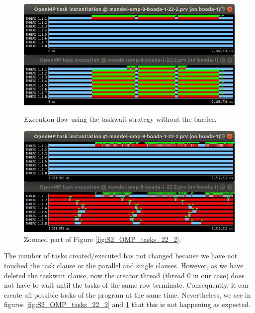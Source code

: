 \documentclass[12pt, a4paper]{article}
\begin{document}
\begin{figure}[H]

\begin{minipage}[t]{0.5\linewidth}
  \centering
  \includegraphics[scale=0.345]{./S2_OMP_tasks_22_2}
  \caption{Execution flow using the taskwait strategy without the barrier.}
  \label{fig:S2_OMP_tasks_22_2}
\end{minipage}%
\hspace{0cm}
\begin{minipage}[t]{0.5\linewidth}
  \centering
  \includegraphics[scale=0.345]{./S2_OMP_tasks_22_2_zoom}
  \caption{Zoomed part of Figure \ref{fig:S2_OMP_tasks_22_2}.}
  \label{fig:S2_OMP_tasks_22_2_zoom}
\end{minipage}
\end{figure}

The number of tasks created/executed has not changed because we have not touched the task clause or the parallel and single clauses. However, as we have deleted the taskwait clause, now the creator thread (thread 0 in our case) does not have to wait until the tasks of the same row terminate. Consequently, it can create all possible tasks of the program at the same time. Nevertheless, we see in figures \ref{fig:S2_OMP_tasks_22_2} and \ref{fig:S2_OMP_tasks_22_2_zoom} that this is not happening as expected.
\end{document}
